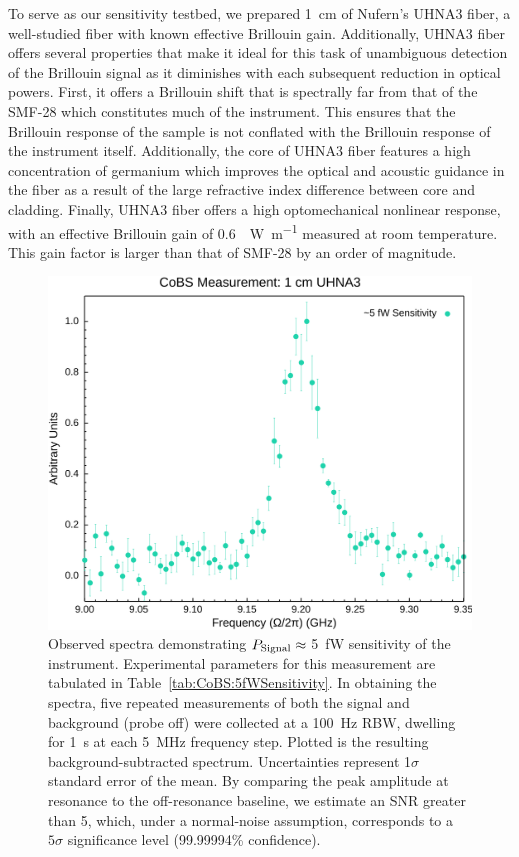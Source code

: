 To serve as our sensitivity testbed, we prepared \SI{1}{\centi\meter} of Nufern's \acl{UHNA3} fiber, a well-studied fiber with known effective Brillouin gain\cite{behunin2015long}. Additionally, \ac{UHNA3} fiber offers several properties that make it ideal for this task of unambiguous detection of the Brillouin signal as it diminishes with each subsequent reduction in optical powers. First, it offers a Brillouin shift that is spectrally far from that of the \ac{SMF-28} which constitutes much of the instrument. This ensures that the Brillouin response of the sample is not conflated with the Brillouin response of the instrument itself. Additionally, the core of \ac{UHNA3} fiber features a high concentration of germanium which improves the optical and acoustic guidance in the fiber as a result of the large refractive index difference between core and cladding. Finally, \ac{UHNA3} fiber offers a high optomechanical nonlinear response, with an effective Brillouin gain of \SI{0.6}{\per\watt\per\meter} measured at room temperature\cite{behunin2015long}. This gain factor is larger than that of \ac{SMF-28} by an order of magnitude\cite{nikles1997brillouin}.

\begin{figure}[t!]
  \centering
  \hspace{-2em}\includegraphics[width=.85\textwidth]{figs/3-CoBS/CoBS Sensitivity Measurement: 1 cm UHNA3 5 fW.png}
  \caption{Observed spectra demonstrating \(P_{\rm Signal}\approx\) \SI{5}{\femto\watt} sensitivity of the instrument. Experimental parameters for this measurement are tabulated in Table~\ref{tab:CoBS:5fWSensitivity}. In obtaining the spectra, five repeated measurements of both the signal and background (probe off) were collected at a \SI{100}{\hertz} \ac{RBW}, dwelling for \SI{1}{\second} at each \SI{5}{\mega\hertz} frequency step. Plotted is the resulting background-subtracted spectrum. Uncertainties represent 1\(\sigma\) standard error of the mean. By comparing the peak amplitude at resonance to the off-resonance baseline, we estimate an \ac{SNR} greater than 5, which, under a normal-noise assumption, corresponds to a \(5\sigma\) significance level (99.99994\% confidence).}
  \label{fig:CoBS:5fWSensitivity}
\end{figure}

